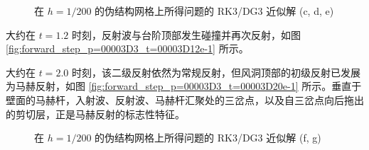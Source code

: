 \begin{figure}[H]
\begin{centering}
{\begin{centering}
\par\end{centering}
}
\par\end{centering}
\caption{在 $h=1/200$ 的伪结构网格上所得问题的
RK3/DG3 近似解 (c, d, e)}
\end{figure}

\newpage{}

大约在 $t=1.2$ 时刻，反射波与台阶顶部发生碰撞并再次反射，如图 \ref{fig:forward_step_p=00003D3_t=00003D12e-1}
所示。

大约在 $t=2.0$ 时刻，该二级反射依然为常规反射，但风洞顶部的初级反射已发展为马赫反射，如图 \ref{fig:forward_step_p=00003D3_t=00003D20e-1}
所示。垂直于壁面的马赫杆，入射波、反射波、马赫杆汇聚处的三岔点，以及自三岔点向后拖出的剪切层，正是马赫反射的标志性特征。

\begin{figure}[h!]
\ContinuedFloat
\begin{centering}
\par\end{centering}
\begin{centering}
\par\end{centering}
\caption{在 $h=1/200$ 的伪结构网格上所得问题的
RK3/DG3 近似解 (f, g)}
\end{figure}

